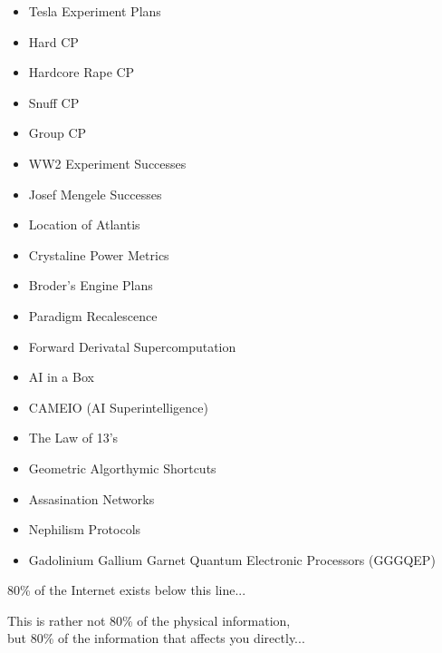 \documentclass[11pt,twoside,a4paper]{book}
\begin{document}
\begin{minipage}[t]{0.45\linewidth}
	\begin{itemize}
		\setlength{\itemsep}{1pt}
		\setlength{\parskip}{0pt}
		\setlength{\parsep}{0pt}
		
		\item Tesla Experiment Plans
		\item Hard CP
		\item Hardcore Rape CP
		\item Snuff CP
		\item Group CP
		\item WW2 Experiment Successes
		\item Josef Mengele Successes
		\item Location of Atlantis
		\item Crystaline Power Metrics
	\end{itemize}
\end{minipage}
\hfill
\begin{minipage}[t]{0.45\linewidth}
	\begin{itemize}
		\setlength{\itemsep}{1pt}
		\setlength{\parskip}{0pt}
		\setlength{\parsep}{0pt}
		
		\item Broder's Engine Plans
		\item Paradigm Recalescence
		\item Forward Derivatal Supercomputation
		\item AI in a Box
		\item CAMEIO (AI Superintelligence)
		\item The Law of 13's
		\item Geometric Algorthymic Shortcuts
		\item Assasination Networks
		\item Nephilism Protocols
	\end{itemize}
\end{minipage}

	\begin{itemize}
		\item Gadolinium Gallium Garnet Quantum Electronic Processors (GGGQEP)
	\end{itemize}

\begin{LARGE} \begin{center} 80\% of the Internet exists below this line... \end{center} \end{LARGE}
\begin{small} \begin{center} This is rather not 80\% of the physical information, ~\\
			but 80\% of the information that affects you directly... \end{center} \end{small}
\end{document}
